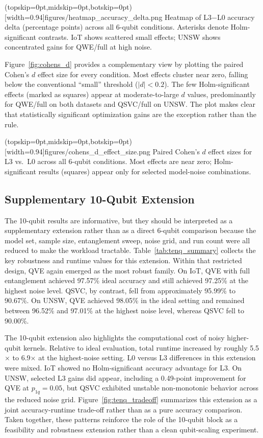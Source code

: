 \documentclass{ieeeaccess}
\begin{document}
\Figure[t!](topskip=0pt,midskip=0pt,botskip=0pt)[width=0.94\textwidth]{figures/heatmap_accuracy_delta.png}
{Heatmap of L3$-$L0 accuracy delta (percentage points) across all 6-qubit conditions. Asterisks denote Holm-significant contrasts. IoT shows scattered small effects; UNSW shows concentrated gains for QWE/full at high noise.\label{fig:heatmap_delta}}

Figure~\ref{fig:cohens_d} provides a complementary view by plotting the paired Cohen's $d$ effect size for every condition. Most effects cluster near zero, falling below the conventional ``small'' threshold ($|d| < 0.2$). The few Holm-significant effects (marked as squares) appear at moderate-to-large $d$ values, predominantly for QWE/full on both datasets and QSVC/full on UNSW. The plot makes clear that statistically significant optimization gains are the exception rather than the rule.

\Figure[t!](topskip=0pt,midskip=0pt,botskip=0pt)[width=0.94\textwidth]{figures/cohens_d_effect_size.png}
{Paired Cohen's $d$ effect sizes for L3 vs.\ L0 across all 6-qubit conditions. Most effects are near zero; Holm-significant results (squares) appear only for selected model-noise combinations.\label{fig:cohens_d}}

\subsection{Supplementary 10-Qubit Extension}

The 10-qubit results are informative, but they should be interpreted as a supplementary extension rather than as a direct 6-qubit comparison because the model set, sample size, entanglement sweep, noise grid, and run count were all reduced to make the workload tractable. Table~\ref{tab:tenq_summary} collects the key robustness and runtime values for this extension. Within that restricted design, QVE again emerged as the most robust family. On IoT, QVE with full entanglement achieved 97.57\% ideal accuracy and still achieved 97.25\% at the highest noise level. QSVC, by contrast, fell from approximately 95.99\% to 90.67\%. On UNSW, QVE achieved 98.05\% in the ideal setting and remained between 96.52\% and 97.01\% at the highest noise level, whereas QSVC fell to 90.00\%.

The 10-qubit extension also highlights the computational cost of noisy higher-qubit kernels. Relative to ideal evaluation, total runtime increased by roughly 5.5$\times$ to 6.9$\times$ at the highest-noise setting. L0 versus L3 differences in this extension were mixed. IoT showed no Holm-significant accuracy advantage for L3. On UNSW, selected L3 gains did appear, including a 0.49-point improvement for QVE at $p_{1q}=0.05$, but QSVC exhibited unstable non-monotonic behavior across the reduced noise grid. Figure~\ref{fig:tenq_tradeoff} summarizes this extension as a joint accuracy-runtime trade-off rather than as a pure accuracy comparison. Taken together, these patterns reinforce the role of the 10-qubit block as a feasibility and robustness extension rather than a clean qubit-scaling experiment.
\end{document}
